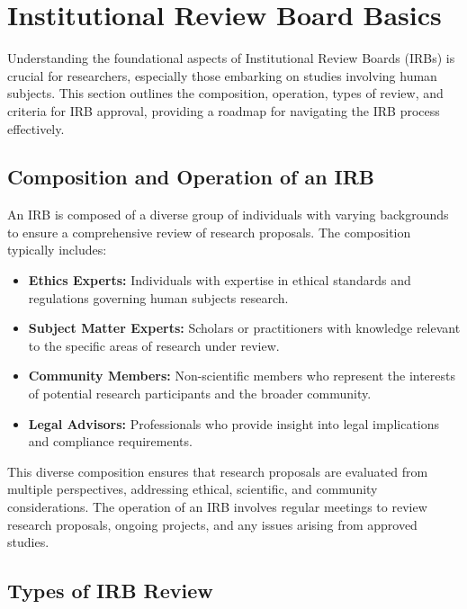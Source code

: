 \documentclass[
]{book}
\providecommand{\tightlist}{%
  \setlength{\itemsep}{0pt}\setlength{\parskip}{0pt}}
\begin{document}
\hypertarget{institutional-review-board-basics}{%
\section{Institutional Review Board Basics}\label{institutional-review-board-basics}}

Understanding the foundational aspects of Institutional Review Boards (IRBs) is crucial for researchers, especially those embarking on studies involving human subjects. This section outlines the composition, operation, types of review, and criteria for IRB approval, providing a roadmap for navigating the IRB process effectively.

\hypertarget{composition-and-operation-of-an-irb}{%
\subsection*{Composition and Operation of an IRB}\label{composition-and-operation-of-an-irb}}

An IRB is composed of a diverse group of individuals with varying backgrounds to ensure a comprehensive review of research proposals. The composition typically includes:

\begin{itemize}
\tightlist
\item
  \textbf{Ethics Experts:} Individuals with expertise in ethical standards and regulations governing human subjects research.
\item
  \textbf{Subject Matter Experts:} Scholars or practitioners with knowledge relevant to the specific areas of research under review.
\item
  \textbf{Community Members:} Non-scientific members who represent the interests of potential research participants and the broader community.
\item
  \textbf{Legal Advisors:} Professionals who provide insight into legal implications and compliance requirements.
\end{itemize}

This diverse composition ensures that research proposals are evaluated from multiple perspectives, addressing ethical, scientific, and community considerations. The operation of an IRB involves regular meetings to review research proposals, ongoing projects, and any issues arising from approved studies.

\hypertarget{types-of-irb-review}{%
\subsection*{Types of IRB Review}\label{types-of-irb-review}}
\end{document}
